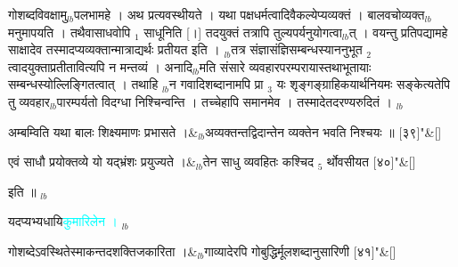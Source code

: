 \documentclass[article,12pt,a4paper]{memoir}%
\newcommand{\quotelemma}[1]{\textcolor{cyan}{#1}}
\newcounter{parCount}
\begin{document}
गोशब्दविवक्षामु{\tiny $_{lb}$}पलभामहे । अथ प्रत्यवस्थीयते । यथा पक्षधर्मत्वादिवैकल्येप्यव्यक्तं । बालवचोव्यक्त{\tiny $_{lb}$}मनुमापयति । तथैवासाधवोपि {\tiny $_{1}$} साधूनिति [।] तदयुक्तं तत्रापि तुल्यपर्यनुयोगत्वा{\tiny $_{lb}$}त् । वयन्तु प्रतिपद्यामहे साक्षादेव तस्मादप्यव्यक्तान्मात्राद्यर्थः प्रतीयत इति । {\tiny $_{lb}$}तत्र संज्ञासंज्ञिसम्बन्धस्याननुभूत {\tiny $_{2}$} त्वादयुक्ताप्रतीतावित्यपि न मन्तव्यं । अनादि{\tiny $_{lb}$}मति संसारे व्यवहारपरम्परायास्तथाभूतायाः सम्बन्धस्योल्लिङ्गितत्वात् । तथाहि {\tiny $_{lb}$}न गवादिशब्दानामपि प्रा {\tiny $_{3}$} यः शृङ्गङ्ग्राहिकयार्थनियमः सङ्केत्यतेपि तु व्यवहार{\tiny $_{lb}$}पारम्पर्यतो विदग्धा निश्चिन्वन्ति । तच्चेहापि समानमेव । तस्मादेतदरण्यरुदितं । {\tiny $_{lb}$} 
	    \pend%
	  
	    
	    \stanza[\smallbreak]
	  अम्बम्विति यथा बालः शिक्ष्यमाणः प्रभासते ।&{\tiny $_{lb}$}अव्यक्तन्तद्विदान्तेन व्यक्तेन भवति निश्चयः ॥ [३९]{\normalfontlatin\large\qquad{}"}\&[\smallbreak]
	  
	  
	  
	    \pstart  \leavevmode%
	    \hphantom{.}
	   
	    \pend%
	  
	    
	    \stanza[\smallbreak]
	  एवं साधौ प्रयोक्तव्ये यो यद्भ्रंशः प्रयुज्यते ।&{\tiny $_{lb}$}तेन साधु व्यवहितः कश्चिद {\tiny $_{5}$} र्थोवसीयत [४०]{\normalfontlatin\large\qquad{}"}\&[\smallbreak]
	  
	  
	  
	    \pstart  \leavevmode%
	    \hphantom{.}
	   इति ॥
	{}
	\pend%
      {\tiny $_{lb}$}

	  
	  \pstart \leavevmode%
	\hphantom{.}यदप्यभ्यधायि\quotelemma{कुमारिलेन ।} {\tiny $_{lb}$} \leavevmode{} 
	    \pend%
	  
	    
	    \stanza[\smallbreak]
	  गोशब्देऽवस्थितेस्माकन्तदशक्तिजकारिता ।&{\tiny $_{lb}$}गाव्यादेरपि गोबुद्धिर्मूलशब्दानुसारिणी [४१]{\normalfontlatin\large\qquad{}"}\&[\smallbreak]
	  
\end{document}
